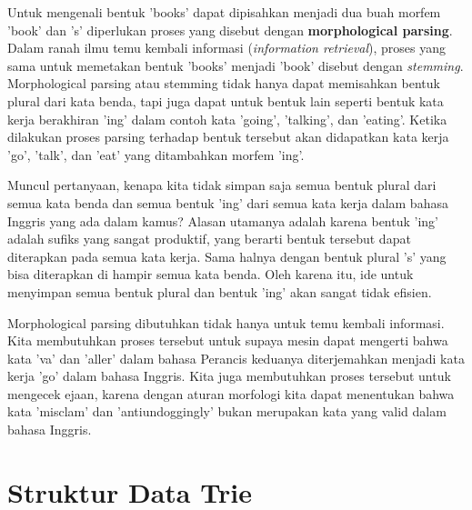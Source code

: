 
Untuk mengenali bentuk 'books' dapat dipisahkan menjadi dua buah morfem 'book' dan 's' diperlukan proses yang disebut dengan \textbf{morphological parsing}. Dalam ranah ilmu temu kembali informasi (\textit{information retrieval}), proses yang sama untuk memetakan bentuk 'books' menjadi 'book' disebut dengan \textit{stemming}. Morphological parsing atau stemming tidak hanya dapat memisahkan bentuk plural dari kata benda, tapi juga dapat untuk bentuk lain seperti bentuk kata kerja berakhiran 'ing' dalam contoh kata 'going', 'talking', dan 'eating'. Ketika dilakukan proses parsing terhadap bentuk tersebut akan didapatkan kata kerja 'go', 'talk', dan 'eat' yang ditambahkan morfem 'ing'. 

Muncul pertanyaan, kenapa kita tidak simpan saja semua bentuk plural dari semua kata benda dan semua bentuk 'ing' dari semua kata kerja dalam bahasa Inggris yang ada dalam kamus? Alasan utamanya adalah karena bentuk 'ing' adalah sufiks yang sangat produktif, yang berarti bentuk tersebut dapat diterapkan pada semua kata kerja. Sama halnya dengan bentuk plural 's' yang bisa diterapkan di hampir semua kata benda. Oleh karena itu, ide untuk menyimpan semua bentuk plural dan bentuk 'ing' akan sangat tidak efisien. 

Morphological parsing dibutuhkan tidak hanya untuk temu kembali informasi. Kita membutuhkan proses tersebut untuk supaya mesin dapat mengerti bahwa kata 'va' dan 'aller' dalam bahasa Perancis keduanya diterjemahkan menjadi kata kerja 'go' dalam bahasa Inggris. Kita juga membutuhkan proses tersebut untuk mengecek ejaan, karena dengan aturan morfologi kita dapat menentukan bahwa kata 'misclam' dan 'antiundoggingly' bukan merupakan kata yang valid dalam bahasa Inggris.


%


\section{Struktur Data Trie}
\label{sec:trie}

